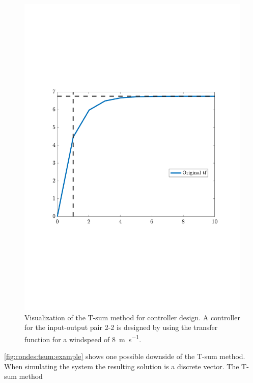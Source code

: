 \begin{figure}[H]
    \center
    \includegraphics[scale=0.7,trim=60 200 50 150,clip]{fig/G_22_T_sum_8ms.pdf}
    \caption{Visualization of the T-sum method for controller design. A controller for the input-output pair 2-2 is designed by using the transfer function for a windspeed of \SI{8}{\metre\per\second}.}
    \label{fig:condes:tsum:example}
\end{figure}

\autoref{fig:condes:tsum:example} shows one possible downside of the T-sum method. 
When simulating the system the resulting solution is a discrete vector.
The T-sum method 


